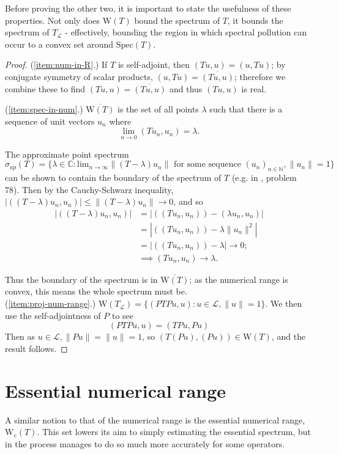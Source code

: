 \documentclass{article}
\newcommand{\Num}{\text{W}}
\newcommand{\Spec}{\text{Spec}}
\begin{document}
Before proving the other two, it is important to state the usefulness of these properties. Not only does $\Num(T)$ bound the spectrum of $T$,
it bounds the spectrum of $T_\mathcal{L}$ - effectively, bounding the region in which spectral pollution can occur to a convex set around $\Spec(T)$.

\begin{proof}
(\ref{item:num-in-R}.) If $T$ is self-adjoint, then $(Tu, u) = (u, Tu)$; by conjugate symmetry of scalar products, $(u, Tu) = \overline{(Tu, u)}$; therefore we combine these to find $(Tu, u) = \overline{(Tu, u)}$ and thus $(Tu, u)$ is real.

(\ref{item:spec-in-num}.) $\overline{\Num(T)}$ is the set of all points $\lambda$ such that there is a sequence of unit vectors $u_n$ where
$$\lim_{n\rightarrow0}( Tu_n, u_n ) = \lambda.$$

The approximate point spectrum
$\sigma_{ap}(T) = \{\lambda \in \mathbb{C}: \text{lim}_{n \rightarrow \infty}\|(T - \lambda)u_n\| \text{ for some sequence } (u_n)_{n \in \mathbb{N}}, \|u_n\| = 1\}$
can be shown to contain the boundary of the spectrum of $T$ (e.g. in  \cite{halmos1982hilbert}, problem 78). Then by the Cauchy-Schwarz inequality,
$|( (T - \lambda)u_n, u_n )| \leq \|(T - \lambda)u_n\| \rightarrow 0$, and so
\begin{equation*}
\begin{split}
|( (T - \lambda)u_n, u_n )| &  = |( (Tu_n, u_n) ) - ( \lambda u_n, u_n )| \\
& = |( (Tu_n, u_n) ) - \lambda \|u_n\|^2| \\
& = |( (Tu_n, u_n) ) - \lambda| \rightarrow 0; \\
& \implies ( Tu_n, u_n ) \rightarrow \lambda.
\end{split}
\end{equation*}

Thus the boundary of the spectrum is in $\overline{\Num(T)}$; as the numerical range is convex,
this means the whole spectrum must be.\\

(\ref{item:proj-num-range}.) $\Num(T_\mathcal{L}) = \{( PTPu, u ) : u \in \mathcal{L}, \|u\|=1\}$.
We then use the self-adjointness of $P$ to see
$$( PTPu, u ) = ( TPu, Pu )$$
Then as $u \in \mathcal{L}, \|Pu\| = \|u\| = 1$,
so $( T(Pu), (Pu) ) \in \Num(T)$, and the result follows.

\end{proof}

\section{Essential numerical range}
A similar notion to that of the numerical range is the essential numerical range, $\Num_e (T)$. This set lowers its aim to simply estimating the essential spectrum,
but in the process manages to do so much more accurately for some operators.
\end{document}
